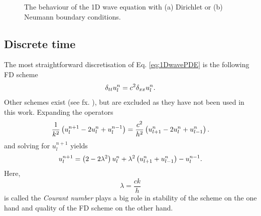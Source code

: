 \begin{figure}[t]
    \centering
    \hspace{0.06\textwidth}
    \caption{The behaviour of the 1D wave equation with (a) Dirichlet or (b) Neumann boundary conditions.\label{fig:boundaryCondsCont}}
\end{figure}

\subsection{Discrete time}
The most straightforward discretisation of Eq. \eqref{eq:1DwavePDE} is the following FD scheme
\begin{equation}\label{eq:1DwaveFDS}
    \delta_{tt} u_l^n = c^2 \delta_{xx} u_l^n.
\end{equation}
Other schemes exist (see fx. \cite{theBible}), but are excluded as they have not been used in this work. Expanding the operators 
\begin{equation}
    \frac{1}{k^2}\left(u_l^{n+1}-2 u_l^n + u_l^{n-1}\right) = \frac{c^2}{h^2} \left(u_{l+1}^n - 2 u_l^n + u_{l-1}^n\right).
\end{equation}
and solving for $u_l^{n+1}$ yields
\begin{equation}\label{eq:1DwaveUpdate}
    u_l^{n+1} = \left(2-2\lambda^2\right) u_l^n  + \lambda^2\left(u_{l+1}^n + u_{l-1}^n\right) - u_l^{n-1}.
\end{equation}
Here, 
\begin{equation}
    \lambda = \frac{ck}{h}
\end{equation}
is called the \textit{Courant number} plays a big role in stability of the scheme on the one hand and quality of the FD scheme on the other hand.


